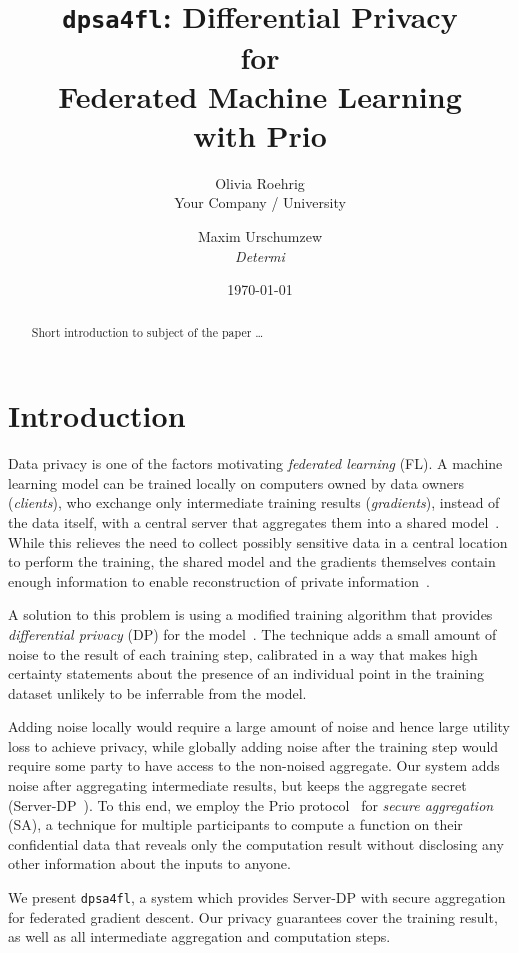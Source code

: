 \documentclass{article}
\title{\texttt{dpsa4fl}: Differential Privacy \\ for \\ Federated Machine
  Learning \\ with Prio}
\author{Olivia Roehrig  \\
	Your Company / University  \\
	\and
	Maxim Urschumzew \\
	\textit{Determi} \\
	}
\date{\today}
\begin{document}
\maketitle


\begin{abstract}
Short introduction to subject of the paper \ldots 
\end{abstract}

\section{Introduction}
Data privacy is one of the factors motivating \emph{federated learning} (FL). A
machine learning model can be trained locally on computers owned by data owners
(\emph{clients}), who exchange only intermediate training results
(\emph{gradients}), instead of the data itself, with a central server that
aggregates them into a shared model~\cite{McMahan2016CommunicationEfficientLO}.
While this relieves the need to collect possibly sensitive data in a central
location to perform the training, the shared model and the gradients themselves
contain enough information to enable reconstruction of private
information~\cite{7958568,Boenisch2021WhenTC}.

A solution to this problem is using a modified training algorithm that provides
\emph{differential privacy} (DP) for the model~\cite{Abadi_2016}. The technique adds
a small amount of noise to the result of each training step, calibrated in a way
that makes high certainty statements about the presence of an individual point
in the training dataset unlikely to be inferrable from the model.

Adding noise locally would require a large amount of noise and hence large
utility loss to achieve privacy, while globally adding noise after the training
step would require some party to have access to the non-noised aggregate. Our
system adds noise after aggregating intermediate results, but keeps the
aggregate secret (Server-DP~\cite{dprio}). To this end,
we employ the Prio protocol~\cite{prio} for \emph{secure aggregation} (SA), a technique for multiple
participants to compute a function on their confidential data that reveals only
the computation result without disclosing any other information about the
inputs to anyone.

We present \texttt{dpsa4fl}, a system which provides Server-DP with
secure aggregation for federated gradient descent. Our privacy guarantees cover the training result,
as well as all intermediate aggregation and computation steps.
\end{document}
